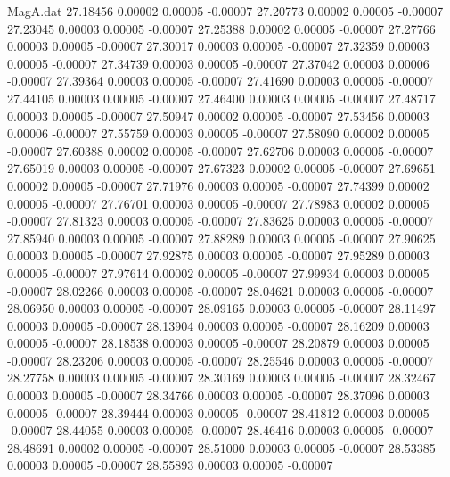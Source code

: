 \begin{filecontents}{MagA.dat}
  27.18456    0.00002    0.00005   -0.00007
  27.20773    0.00002    0.00005   -0.00007
  27.23045    0.00003    0.00005   -0.00007
  27.25388    0.00002    0.00005   -0.00007
  27.27766    0.00003    0.00005   -0.00007
  27.30017    0.00003    0.00005   -0.00007
  27.32359    0.00003    0.00005   -0.00007
  27.34739    0.00003    0.00005   -0.00007
  27.37042    0.00003    0.00006   -0.00007
  27.39364    0.00003    0.00005   -0.00007
  27.41690    0.00003    0.00005   -0.00007
  27.44105    0.00003    0.00005   -0.00007
  27.46400    0.00003    0.00005   -0.00007
  27.48717    0.00003    0.00005   -0.00007
  27.50947    0.00002    0.00005   -0.00007
  27.53456    0.00003    0.00006   -0.00007
  27.55759    0.00003    0.00005   -0.00007
  27.58090    0.00002    0.00005   -0.00007
  27.60388    0.00002    0.00005   -0.00007
  27.62706    0.00003    0.00005   -0.00007
  27.65019    0.00003    0.00005   -0.00007
  27.67323    0.00002    0.00005   -0.00007
  27.69651    0.00002    0.00005   -0.00007
  27.71976    0.00003    0.00005   -0.00007
  27.74399    0.00002    0.00005   -0.00007
  27.76701    0.00003    0.00005   -0.00007
  27.78983    0.00002    0.00005   -0.00007
  27.81323    0.00003    0.00005   -0.00007
  27.83625    0.00003    0.00005   -0.00007
  27.85940    0.00003    0.00005   -0.00007
  27.88289    0.00003    0.00005   -0.00007
  27.90625    0.00003    0.00005   -0.00007
  27.92875    0.00003    0.00005   -0.00007
  27.95289    0.00003    0.00005   -0.00007
  27.97614    0.00002    0.00005   -0.00007
  27.99934    0.00003    0.00005   -0.00007
  28.02266    0.00003    0.00005   -0.00007
  28.04621    0.00003    0.00005   -0.00007
  28.06950    0.00003    0.00005   -0.00007
  28.09165    0.00003    0.00005   -0.00007
  28.11497    0.00003    0.00005   -0.00007
  28.13904    0.00003    0.00005   -0.00007
  28.16209    0.00003    0.00005   -0.00007
  28.18538    0.00003    0.00005   -0.00007
  28.20879    0.00003    0.00005   -0.00007
  28.23206    0.00003    0.00005   -0.00007
  28.25546    0.00003    0.00005   -0.00007
  28.27758    0.00003    0.00005   -0.00007
  28.30169    0.00003    0.00005   -0.00007
  28.32467    0.00003    0.00005   -0.00007
  28.34766    0.00003    0.00005   -0.00007
  28.37096    0.00003    0.00005   -0.00007
  28.39444    0.00003    0.00005   -0.00007
  28.41812    0.00003    0.00005   -0.00007
  28.44055    0.00003    0.00005   -0.00007
  28.46416    0.00003    0.00005   -0.00007
  28.48691    0.00002    0.00005   -0.00007
  28.51000    0.00003    0.00005   -0.00007
  28.53385    0.00003    0.00005   -0.00007
  28.55893    0.00003    0.00005   -0.00007

\end{filecontents}
